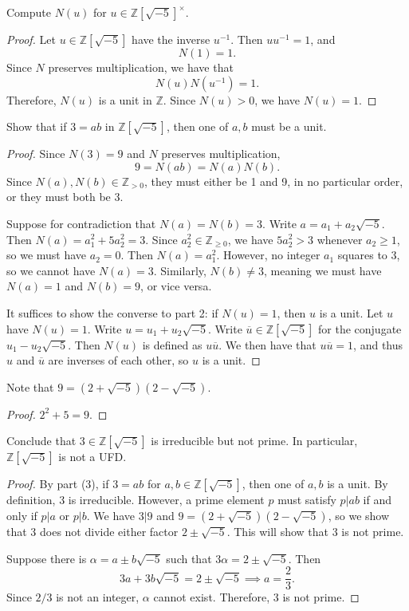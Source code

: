 \documentclass[11pt, letterpaper]{article}
\begin{document}
\begin{problem}
	Compute $N(u)$ for $u\in \mathbb{Z} [\sqrt{-5} ]^\times $.
\end{problem}
\begin{proof}
	Let $u\in \mathbb{Z} [\sqrt{-5} ]$ have the inverse $u^{-1} $. Then $uu^{-1} =1$, and
	\[
		N(1)=1
	.\]
	Since $N$ preserves multiplication, we have that
	\[
		N(u)N(u^{-1} )=1
	.\]
	Therefore, $N(u)$ is a unit in $\mathbb{Z}$. Since $N(u)>0$, we have $N(u)=1$.
\end{proof}
\begin{problem}
	Show that if $3=ab$ in $\mathbb{Z} [\sqrt{-5} ]$, then one of $a,b$ must be a unit.
\end{problem}
\begin{proof}
	Since $N(3)=9$ and $N$ preserves multiplication,
	\[
		9=N(ab)=N(a)N(b)
	.\]
	Since $N(a),N(b)\in\mathbb{Z} _{>0} $, they must either be 1 and 9, in no particular order, or they must both be 3.

	Suppose for contradiction that $N(a)=N(b)=3$. Write $a=a_1+a_2\sqrt{-5} $. Then $N(a)=a_1^2+5a_2^2=3$. Since $a_2^2\in\mathbb{Z}_{\geq 0} $, we have $5a_2^2>3$ whenever $a_2 \geq 1$, so we must have $a_2=0$. Then $N(a)=a_1^2$. However, no integer $a_1$ squares to 3, so we cannot have $N(a)=3$. Similarly, $N(b)\neq 3$, meaning we must have $N(a)=1$ and $N(b)=9$, or vice versa.

	It suffices to show the converse to part 2: if $N(u)=1$, then $u$ is a unit. Let $u$ have $N(u)=1$. Write $u=u_1+u_2\sqrt{-5} $. Write $\overline{u} \in\mathbb{Z} [\sqrt{-5} ]$ for the conjugate $u_1-u_2 \sqrt{-5} $. Then $N(u)$ is defined as $u \overline{u} $. We then have that $u \overline{u} =1$, and thus $u$ and $\overline{u} $ are inverses of each other, so $u$ is a unit.
\end{proof}
\begin{problem}
	Note that $9=\left( 2+\sqrt{-5}  \right) \left( 2-\sqrt{-5}  \right) $.
\end{problem}
\begin{proof}
	$2^2+5=9$.
\end{proof}
\begin{problem}
	Conclude that $3\in\mathbb{Z} [\sqrt{-5} ]$ is irreducible but not prime. In particular, $\mathbb{Z} [\sqrt{-5} ]$ is not a UFD.
\end{problem}
\begin{proof}
By part (3), if $3=ab$ for $a,b\in\mathbb{Z} [\sqrt{-5} ]$, then one of $a,b$ is a unit. By definition, 3 is irreducible. However, a prime element $p$ must satisfy $p|ab$ if and only if $p|a$ or $p|b$. We have $3|9$ and $9=\left( 2+\sqrt{-5}  \right) \left( 2-\sqrt{-5}  \right) $, so we show that 3 does not divide either factor $2\pm \sqrt{-5} $. This will show that 3 is not prime.

Suppose there is $\alpha =a\pm b\sqrt{-5} $ such that $3\alpha =2\pm\sqrt{-5} $. Then
\[
	3a+3b\sqrt{-5} =2\pm\sqrt{-5} \implies a=\frac{2}{3} 
.\]
Since $2/3$ is not an integer, $\alpha $ cannot exist. Therefore, 3 is not prime.
\end{proof}
\end{document}

